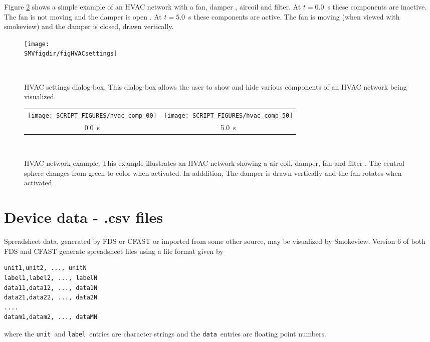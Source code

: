 \documentclass[11pt,twoside]{book}
\begin{document}
Figure \ref{figHVACexample} shows a simple example of an HVAC network with a fan, damper , aircoil
and filter.  At $t=0.0$~s these components are inactive.  The fan is not moving and
the damper is open .
At $t=5.0$~s these components are active.  The fan is moving (when viewed with smokeview)
 and the damper is closed, drawn vertically.

\begin{figure}[bph]
\begin{center}
\texttt{[image: \\SMVfigdir/figHVACsettings]}
\end{center}
\caption[HVAC settings dialog box.]{HVAC settings dialog box.
This dialog box allows the user to show and hide various components of an HVAC
network being visualized.}\ \label{figHVACsettings}
\end{figure}


\begin{figure}[bph]
\begin{center}
\begin{tabular}{cc}
\texttt{[image: SCRIPT\_FIGURES/hvac\_comp\_00]}&
\texttt{[image: SCRIPT\_FIGURES/hvac\_comp\_50]}\\
0.0~s&5.0~s
\end{tabular}
\end{center}
\caption[HVAC network example.]{HVAC network example.
This example illustrates an HVAC network showing a air coil, damper, fan and filter . The central sphere
changes from green to color when activated.
In adddition, The damper is drawn vertically and the fan rotates when activated.}\ \label{figHVACexample}
\end{figure}


\section{Device data - .csv files}
Spreadsheet data, generated by FDS or CFAST or imported from some
other source, may be visualized by Smokeview.
Version 6 of both FDS and CFAST
generate spreadsheet files using a file format given by
\begin{lstlisting}
unit1,unit2, ..., unitN
label1,label2, ..., labelN
data11,data12, ..., data1N
data21,data22, ..., data2N
....
datam1,datam2, ..., dataMN
\end{lstlisting}
where the {\tt unit}\ and {\tt label}\ entries are character strings and the
{\tt data}\ entries are floating point numbers.
\end{document}
